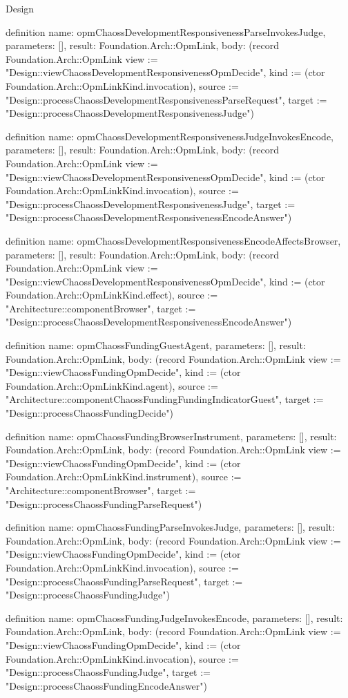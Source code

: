 \begin{lexlean}{Design}
\begin{semanticmodule}
definition{
  name: opmChaossDevelopmentResponsivenessParseInvokesJudge,
  parameters: [],
  result: Foundation.Arch::OpmLink,
  body: (record Foundation.Arch::OpmLink {view := "Design::viewChaossDevelopmentResponsivenessOpmDecide", kind := (ctor Foundation.Arch::OpmLinkKind.invocation), source := "Design::processChaossDevelopmentResponsivenessParseRequest", target := "Design::processChaossDevelopmentResponsivenessJudge"})
}

definition{
  name: opmChaossDevelopmentResponsivenessJudgeInvokesEncode,
  parameters: [],
  result: Foundation.Arch::OpmLink,
  body: (record Foundation.Arch::OpmLink {view := "Design::viewChaossDevelopmentResponsivenessOpmDecide", kind := (ctor Foundation.Arch::OpmLinkKind.invocation), source := "Design::processChaossDevelopmentResponsivenessJudge", target := "Design::processChaossDevelopmentResponsivenessEncodeAnswer"})
}

definition{
  name: opmChaossDevelopmentResponsivenessEncodeAffectsBrowser,
  parameters: [],
  result: Foundation.Arch::OpmLink,
  body: (record Foundation.Arch::OpmLink {view := "Design::viewChaossDevelopmentResponsivenessOpmDecide", kind := (ctor Foundation.Arch::OpmLinkKind.effect), source := "Architecture::componentBrowser", target := "Design::processChaossDevelopmentResponsivenessEncodeAnswer"})
}

definition{
  name: opmChaossFundingGuestAgent,
  parameters: [],
  result: Foundation.Arch::OpmLink,
  body: (record Foundation.Arch::OpmLink {view := "Design::viewChaossFundingOpmDecide", kind := (ctor Foundation.Arch::OpmLinkKind.agent), source := "Architecture::componentChaossFundingFundingIndicatorGuest", target := "Design::processChaossFundingDecide"})
}

definition{
  name: opmChaossFundingBrowserInstrument,
  parameters: [],
  result: Foundation.Arch::OpmLink,
  body: (record Foundation.Arch::OpmLink {view := "Design::viewChaossFundingOpmDecide", kind := (ctor Foundation.Arch::OpmLinkKind.instrument), source := "Architecture::componentBrowser", target := "Design::processChaossFundingParseRequest"})
}

definition{
  name: opmChaossFundingParseInvokesJudge,
  parameters: [],
  result: Foundation.Arch::OpmLink,
  body: (record Foundation.Arch::OpmLink {view := "Design::viewChaossFundingOpmDecide", kind := (ctor Foundation.Arch::OpmLinkKind.invocation), source := "Design::processChaossFundingParseRequest", target := "Design::processChaossFundingJudge"})
}

definition{
  name: opmChaossFundingJudgeInvokesEncode,
  parameters: [],
  result: Foundation.Arch::OpmLink,
  body: (record Foundation.Arch::OpmLink {view := "Design::viewChaossFundingOpmDecide", kind := (ctor Foundation.Arch::OpmLinkKind.invocation), source := "Design::processChaossFundingJudge", target := "Design::processChaossFundingEncodeAnswer"})
}


\end{semanticmodule}
\end{lexlean}
